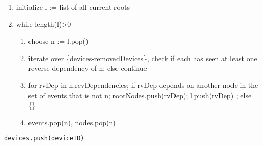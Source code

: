 \begin{enumerate}
    \item initialize l := list of all current roots
    \item while length(l)>0 
    \begin{enumerate}
        \item choose n := l.pop()
        \item iterate over \{devices-removedDevices\}, check if each has seen at least one reverse dependency of n; else continue
        \item for rvDep in n.revDependencies;  if rvDep depends on another node in the set of events that is not n; rootNodes.push(rvDep); l.push(rvDep) ; else \{\}
        \item events.pop(n), nodes.pop(n)
    \end{enumerate}
\end{enumerate}

\noindent
\texttt{devices.push(deviceID)}




